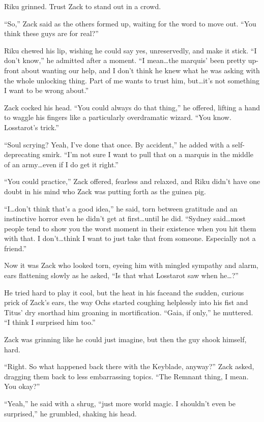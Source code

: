 Riku grinned. Trust Zack to stand out in a crowd.

``So,'' Zack said as the others formed up, waiting for the word to move out. ``You think these guys are for real?''

Riku chewed his lip, wishing he could say yes, unreservedly, and make it stick. ``I don't know,'' he admitted after a moment. ``I mean\ldots the marquis' been pretty up-front about wanting our help, and I don't think he knew what he was asking with the whole unlocking thing. Part of me wants to trust him, but\ldots it's not something I want to be wrong about.''

Zack cocked his head. ``You could always do that thing,'' he offered, lifting a hand to waggle his fingers like a particularly overdramatic wizard. ``You know. Losstarot's trick.''

``Soul scrying? Yeah, I've done that once. By accident,'' he added with a self-deprecating smirk. ``I'm not sure I want to pull that on a marquis in the middle of an army\ldots even if I do get it right.''

``You could practice,'' Zack offered, fearless and relaxed, and Riku didn't have one doubt in his mind who Zack was putting forth as the guinea pig.

``I\ldots don't think that's a good idea,'' he said, torn between gratitude and an instinctive horror even he didn't get at first\ldots until he did. ``Sydney said\ldots most people tend to show you the worst moment in their existence when you hit them with that. I don't\ldots think I want to just take that from someone. Especially not a friend.''

Now it was Zack who looked torn, eyeing him with mingled sympathy and alarm, ears flattening slowly as he asked, ``Is that what Losstarot saw when he\ldots ?''

He tried hard to play it cool, but the heat in his face\textemdash and the sudden, curious prick of Zack's ears, the way Ochs started coughing helplessly into his fist and Titus' dry snort\textemdash had him groaning in mortification. ``Gaia, if only,'' he muttered. ``I think I surprised him too.''

Zack was grinning like he could just imagine, but then the guy shook himself, hard.

``Right. So what happened back there with the Keyblade, anyway?'' Zack asked, dragging them back to less embarrassing topics. ``The Remnant thing, I mean. You okay?''

``Yeah,'' he said with a shrug, ``just more world magic. I shouldn't even be surprised,'' he grumbled, shaking his head.

